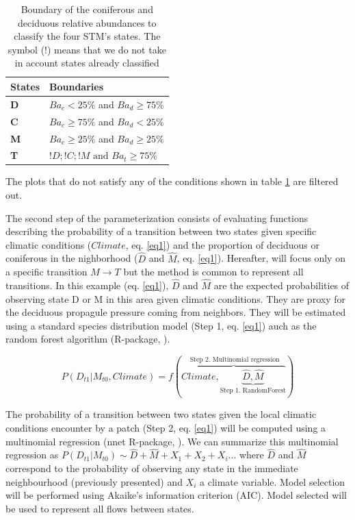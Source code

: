 \begin{table}[h]
\centering
\caption{Boundary of the coniferous and deciduous relative abundances to classify the four STM's states. The symbol ($!$) means that we do not take in account states already classified}
\begin{tabular}{ll}
	States  & Boundaries                            \\
	\hline
	\textbf{D} & $Ba_c< 25\%$ and $Ba_d \geq 75\%$    \\
	\textbf{C} & $Ba_c \geq 75\%$ and $Ba_d < 25\%$    \\
	\textbf{M} & $Ba_c \geq 25\%$ and $Ba_d \geq 25\%$ \\
	\textbf{T} & $!D;!C;!M \text{ and }  Ba_t  \geq 75\%$                                
\end{tabular}

\label{bound}
\end{table}

The plots that do not satisfy any of the conditions
shown in table \ref{bound} are filtered out. 

The second step of the parameterization consists of evaluating functions describing the probability of a
transition between two states given specific climatic
conditions ($Climate$, eq. \ref{eq1}) and the proportion of deciduous or coniferous
in the nighborhood ($\hat{D}$ and $\hat{M}$, eq. \ref{eq1}).  Hereafter, will focus
only on a specific transition $M \rightarrow T$ but the method is common to represent 
all transitions. In this example (eq. \ref{eq1}),  $\hat{D}$
and $\hat{M}$ are the expected probabilities of observing state D or M in this
area given climatic conditions. They are proxy for the deciduous propagule pressure coming from neighbors. They will be estimated using  a standard species distribution model (Step 1, eq. \ref{eq1}) auch as the random forest algorithm (R-package,
\cite{Liaw2002a}).

\begin{equation}
	P(D_{t1}|M_{t0}, Climate) = f(\overbrace{Climate, \underbrace{\hat{D}, \hat{M}}_\text{Step 1. RandomForest}}^\text{ Step 2. Multinomial regression})
\label{eq1}
\end{equation}

The probability of a transition between two states given the local climatic
conditions encounter by a patch (Step 2, eq. \ref{eq1}) will be computed using a multinomial
regression (nnet R-package, \cite{Venables2002}). We can summarize this
multinomial regression as $P(D_{t1}|M_{t0}) \sim \hat{D} + \hat{M} +
X_1+X_2+X_i... $ where $\hat{D}$ and $\hat{M}$ correspond to the probability
of observing any state in the immediate neighbourhood (previously presented)
and $X_i$ a climate variable. Model selection will be performed using Akaike's
information criterion (AIC). Model selected will be used to represent all
flows between states.   \\


